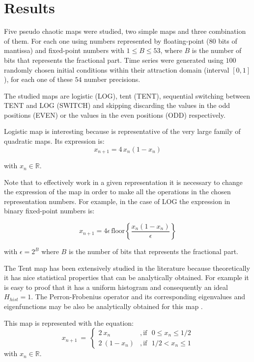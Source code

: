 \section{Results}\label{sec:resultados}

Five pseudo chaotic maps were studied, two simple maps and three combination of them.
For each one using numbers represented by floating-point (80 bits of mantissa) and  fixed-point numbers with $1\leq B \leq 53$, where $B$ is the number of bits that represents the fractional part.
Time series were generated using $100$ randomly chosen initial conditions within their attraction domain (interval $[0,1]$), for each one of these $54$ number precisions.

The studied maps are logistic (LOG), tent (TENT), sequential switching between TENT and LOG (SWITCH) and skipping discarding the values in the odd positions (EVEN) or the values in the even positions (ODD) respectively.

Logistic map is interesting because is representative of the very large family of quadratic maps.
Its expression is:
%
\begin{equation}\label{eq:logimap}
x_{n+1}=4\,x_{n}(1-x_{n}) 
\end{equation}

\noindent with $x_n \in \mathbb{R}$.

Note that to effectively work in a given representation it is necessary to change the expression of the map in order to make all the operations in the chosen representation numbers. For example, in the case of LOG the expression in binary fixed-point numbers is:

\begin{equation}\label{eq:logimapB2}
x_{n+1}=4 \epsilon \,\text{floor}\left\{\frac{x_n(1-x_n)}{\epsilon}\right\}
\end{equation}

\noindent with $\epsilon = 2^B$ where $B$ is the number of bits that represents the fractional part.

The Tent map has been extensively studied in the literature because theoretically it has nice statistical properties that can be analytically obtained.
For example it is easy to proof that it has a uniform histogram and consequently an ideal $H_{hist}=1$.
The Perron-Frobenius operator and its corresponding eigenvalues and eigenfunctions may be also be analytically obtained for this map \cite{Lasota1994}.

This map is represented with the equation:
\begin{equation}\label{eq:tentmap}
x_{n+1}~=~ \left\{ \begin{array}{ll}
2~{x_n} &, \textrm{if ~$0\leq x_n\leq 1/2$}\\
2~(1-{x_n}) &, \textrm{if ~$1/2<x_n\leq 1$} 
\end{array} \right. 
\end{equation}
with $x_n \in \mathbb{R}$.

